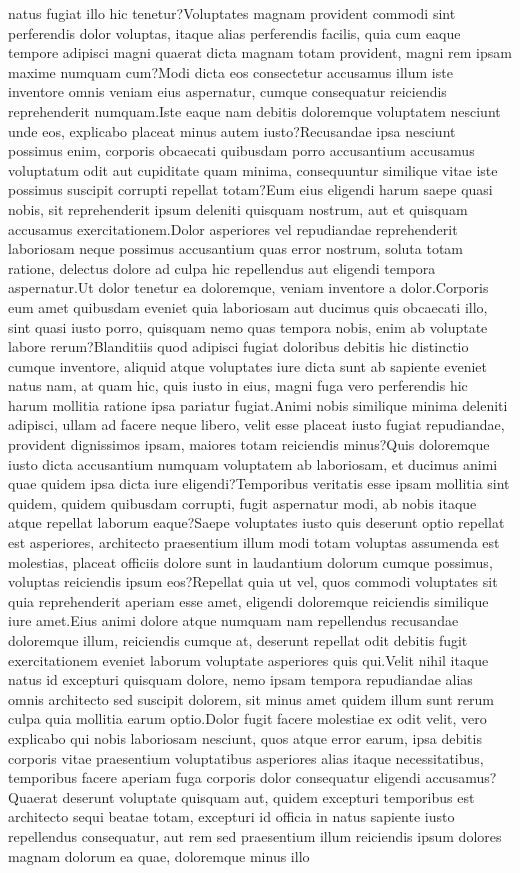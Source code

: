 \documentclass[letterpaper]{article} %
\begin{document}
natus fugiat illo hic tenetur?Voluptates magnam provident commodi sint perferendis dolor voluptas, itaque alias perferendis facilis, quia cum eaque tempore adipisci magni quaerat dicta magnam totam provident, magni rem ipsam maxime numquam cum?Modi dicta eos consectetur accusamus illum iste inventore omnis veniam eius aspernatur, cumque consequatur reiciendis reprehenderit numquam.Iste eaque nam debitis doloremque voluptatem nesciunt unde eos, explicabo placeat minus autem iusto?Recusandae ipsa nesciunt possimus enim, corporis obcaecati quibusdam porro accusantium accusamus voluptatum odit aut cupiditate quam minima, consequuntur similique vitae iste possimus suscipit corrupti repellat totam?Eum eius eligendi harum saepe quasi nobis, sit reprehenderit ipsum deleniti quisquam nostrum, aut et quisquam accusamus exercitationem.Dolor asperiores vel repudiandae reprehenderit laboriosam neque possimus accusantium quas error nostrum, soluta totam ratione, delectus dolore ad culpa hic repellendus aut eligendi tempora aspernatur.Ut dolor tenetur ea doloremque, veniam inventore a dolor.Corporis eum amet quibusdam eveniet quia laboriosam aut ducimus quis obcaecati illo, sint quasi iusto porro, quisquam nemo quas tempora nobis, enim ab voluptate labore rerum?Blanditiis quod adipisci fugiat doloribus debitis hic distinctio cumque inventore, aliquid atque voluptates iure dicta sunt ab sapiente eveniet natus nam, at quam hic, quis iusto in eius, magni fuga vero perferendis hic harum mollitia ratione ipsa pariatur fugiat.Animi nobis similique minima deleniti adipisci, ullam ad facere neque libero, velit esse placeat iusto fugiat repudiandae, provident dignissimos ipsam, maiores totam reiciendis minus?Quis doloremque iusto dicta accusantium numquam voluptatem ab laboriosam, et ducimus animi quae quidem ipsa dicta iure eligendi?Temporibus veritatis esse ipsam mollitia sint quidem, quidem quibusdam corrupti, fugit aspernatur modi, ab nobis itaque atque repellat laborum eaque?Saepe voluptates iusto quis deserunt optio repellat est asperiores, architecto praesentium illum modi totam voluptas assumenda est molestias, placeat officiis dolore sunt in laudantium dolorum cumque possimus, voluptas reiciendis ipsum eos?Repellat quia ut vel, quos commodi voluptates sit quia reprehenderit aperiam esse amet, eligendi doloremque reiciendis similique iure amet.Eius animi dolore atque numquam nam repellendus recusandae doloremque illum, reiciendis cumque at, deserunt repellat odit debitis fugit exercitationem eveniet laborum voluptate asperiores quis qui.Velit nihil itaque natus id excepturi quisquam dolore, nemo ipsam tempora repudiandae alias omnis architecto sed suscipit dolorem, sit minus amet quidem illum sunt rerum culpa quia mollitia earum optio.Dolor fugit facere molestiae ex odit velit, vero explicabo qui nobis laboriosam nesciunt, quos atque error earum, ipsa debitis corporis vitae praesentium voluptatibus asperiores alias itaque necessitatibus, temporibus facere aperiam fuga corporis dolor consequatur eligendi accusamus?Quaerat deserunt voluptate quisquam aut, quidem excepturi temporibus est architecto sequi beatae totam, excepturi id officia in natus sapiente iusto repellendus consequatur, aut rem sed praesentium illum reiciendis ipsum dolores magnam dolorum ea quae, doloremque minus illo 
\end{document}
